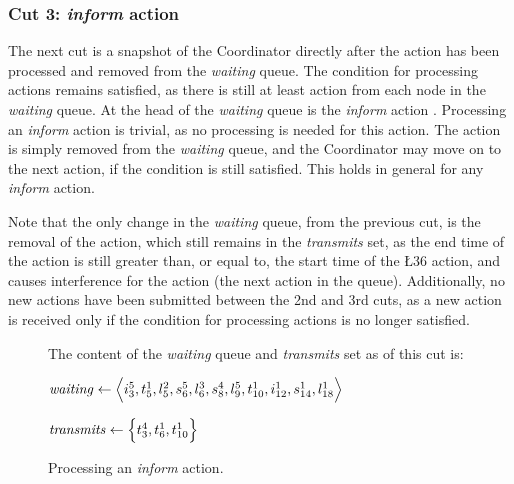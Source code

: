 \subsubsection{Cut 3: \textit{inform} action}
The next cut is a snapshot of the Coordinator directly after the  action has been processed and
removed from the \textit{waiting} queue. The condition for processing actions remains satisfied, as there is
still at least action from each node in the \textit{waiting} queue. At the head of the \textit{waiting} queue
is the \textit{inform} action . Processing an \textit{inform} action is trivial, as no processing is
needed for this action. The action is simply removed from the \textit{waiting} queue, and the Coordinator may
move on to the next action, if the condition is still satisfied. This holds in general for any \textit{inform}
action. \smallbreak

Note that the only change in the \textit{waiting} queue, from the previous cut, is the removal of the 
action, which still remains in the \textit{transmits} set, as the end time of the  action is still
greater than, or equal to, the start time of the \L{3}{6} action, and causes interference for the 
action (the next action in the queue). Additionally, no new actions have been submitted between the 2nd and
3rd cuts, as a new action is received only if the condition for processing actions is no longer satisfied.
\medbreak

\begin{figure}[H]
    \caption{Processing an \textit{inform} action.}\label{tikz:coordinatormsc3}
     \par

    \begin{minipage}[h]{14.5cm}
        The content of the \textit{waiting} queue and \textit{transmits} set as of this cut is: \smallbreak

        $\mathit{waiting} \leftarrow \Big\langle i^{5}_{3}, t^{1}_{5}, l^{2}_{5}, s^{5}_{6}, l^{3}_{6}, s^{4}_{8},
            l^{5}_{9}, t^{1}_{10}, i^{1}_{12}, s^{1}_{14}, l^{1}_{18} \Big\rangle$

        $\mathit{transmits} \leftarrow \Big\{ t^{4}_{3}, t^{1}_{6}, t^{1}_{10} \Big\}$
    \end{minipage}
\end{figure}


